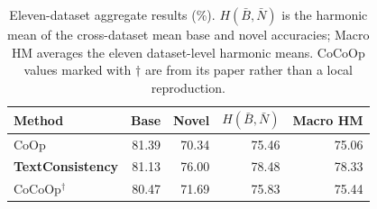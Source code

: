 \begin{table}[t]
\centering
\caption{Eleven-dataset aggregate results (\%). $H(\bar B,\bar N)$ is the harmonic mean of the cross-dataset mean base and novel accuracies; Macro HM averages the eleven dataset-level harmonic means. CoCoOp values marked with $\dagger$ are from its paper rather than a local reproduction.}
\label{tab:average_metrics}
\small
\begin{tabular}{lrrrr}
\toprule
Method & Base & Novel & $H(\bar B,\bar N)$ & Macro HM \\
\midrule
CoOp & 81.39 & 70.34 & 75.46 & 75.06 \\
\textbf{TextConsistency} & 81.13 & 76.00 & 78.48 & 78.33 \\
CoCoOp$^\dagger$ & 80.47 & 71.69 & 75.83 & 75.44 \\
\bottomrule
\end{tabular}
\end{table}

